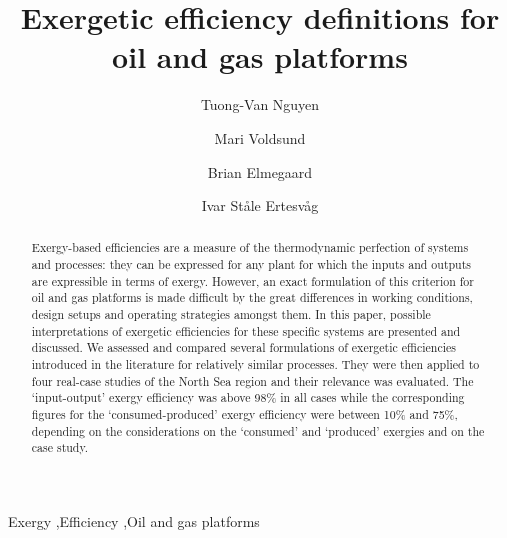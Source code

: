 \documentclass[times,3p]{elsarticle}
\begin{document}
\begin{frontmatter}

\title{Exergetic efficiency definitions for oil and gas platforms}

\author[dtu]{Tuong-Van Nguyen}  
\author[ntnu1]{Mari Voldsund} 
\author[dtu]{Brian Elmegaard} 
\author[ntnu2]{Ivar St\aa le Ertesv\aa g}  

\address[dtu]{Section of Thermal Energy, Department of Mechanical Engineering, Technical University of Denmark,\\ Building 403, Nils Koppels All\'{e}, 2800 Kongens Lyngby, Denmark}
\address[ntnu1]{Department of Chemistry, Norwegian University of Science and Technology, \\ H\o gskoleringen 5, 7491 Trondheim, Norway}
\address[ntnu2]{Department of Energy and Process Engineering, Norwegian University of Science and Technology, \\ Kolbj\o rn Hejes vei 1b., 7491 Trondheim, Norway}

\begin{abstract}

Exergy-based efficiencies are a measure of the thermodynamic perfection of systems and processes: they can be expressed for any plant for which the inputs and outputs are expressible in terms of exergy. However, an exact formulation of this criterion for oil and gas platforms is made difficult by the great differences in working conditions, design setups and operating strategies amongst them. In this paper, possible interpretations of exergetic efficiencies for these specific systems are presented and discussed. We assessed and compared several formulations of exergetic efficiencies introduced in the literature for relatively similar processes. They were then applied to four real-case studies of the North Sea region and their relevance was evaluated. The `input-output' exergy efficiency was above 98\% in all cases while the corresponding figures for the `consumed-produced' exergy efficiency were between 10\% and 75\%, depending on the considerations on the `consumed' and `produced' exergies and on the case study. 

\end{abstract}

\begin{keyword}
Exergy \sep Efficiency \sep Oil and gas platforms
\end{keyword}

\end{frontmatter}
\end{document}
